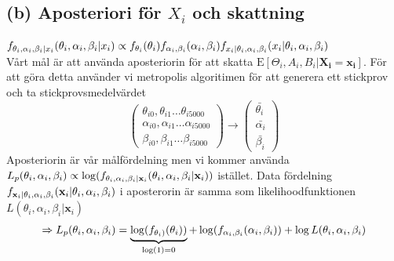 \documentclass{assignment}
\begin{document}
\subsection*{(b) Aposteriori för $X_i$ och skattning} 
$f_{\theta_i, \alpha_i,\beta_i|x_i}(\theta_i, \alpha_i,\beta_i|x_i) \propto f_{\theta_i}(\theta_i)f_{\alpha_i,\beta_i}(\alpha_i,\beta_i) f_{x_i|\theta_i,\alpha_i,\beta_i}(x_i|\theta_i,\alpha_i,\beta_i)$
\\ Vårt mål är att använda aposteriorin för att skatta $\text{E}[\Theta_i,A_i,B_i|\mathbf{X_i}=\mathbf{x_i}]$.
För att göra detta använder vi metropolis algoritimen för att generera ett stickprov och ta stickprovsmedelvärdet
$$\begin{pmatrix} \theta_{i0},\theta_{i1} \dots \theta_{i5000}\\ \alpha_{i0},\alpha_{i1}\dots \alpha_{i5000}  \\ \beta_{i0},\beta_{i1}\dots \beta_{i5000}\end{pmatrix} \longrightarrow
\begin{pmatrix}
    \bar{\theta_i} \\
    \bar{\alpha_i} \\
    \bar{\beta_i}
\end{pmatrix}$$  
Aposteriorin är vår målfördelning men vi kommer använda $L_{p}(\theta_i, \alpha_i,\beta_i) \propto \log(f_{\theta_i, \alpha_i,\beta_i|\mathbf{x}_i}(\theta_i, \alpha_i,\beta_i|\mathbf{x}_i))$ istället.
Data fördelning $f_{\mathbf{x}_i|\theta_i, \alpha_i,\beta_i}(\mathbf{x}_i|\theta_i, \alpha_i,\beta_i)$ i aposterorin är samma som likelihoodfunktionen 
$L(\theta_i, \alpha_i,\beta_i|\mathbf{x}_i)$
$$
\Rightarrow L_p(\theta_i, \alpha_i,\beta_i) = \underbrace{\log(f_{\theta_i)}(\theta_i))}_{\log(1)=0}+\log(f_{\alpha_i,\beta_i}(\alpha_i,\beta_i))+\log L(\theta_i,\alpha_i,\beta_i)
$$
 
\end{document}
